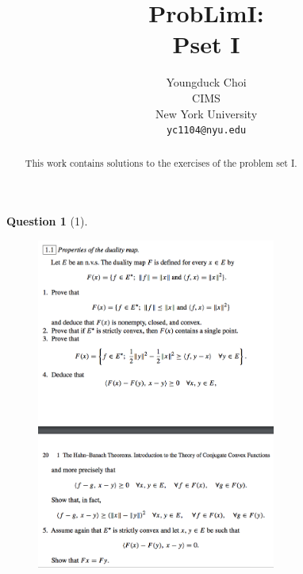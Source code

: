 \documentclass{article} %
\title{ProbLimI: \\
Pset I}
\author{
Youngduck Choi \\
CIMS \\
New York University\\
\texttt{yc1104@nyu.edu} \\
}
\theoremstyle{quest}
\newtheorem*{question}{Question}
\begin{document}
\maketitle

\begin{abstract}
This work contains solutions to the exercises of the problem set I.
\end{abstract}

\bigskip

\begin{question}[1]
\hfill
\begin{figure}[h!]
  \centering
    \includegraphics[width=0.7\textwidth]{funcA-1-1.png}
\end{figure}
\end{question}
\end{document}

